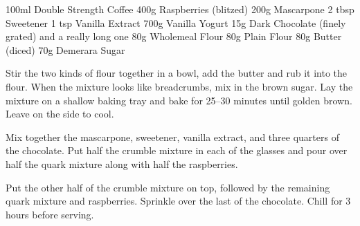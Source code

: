 \vegetarian
\freeze
\begin{ingreds}
     100ml Double Strength Coffee
     400g Raspberries (blitzed)
     200g Mascarpone
     2 tbsp Sweetener
     1 tsp Vanilla Extract
     700g Vanilla Yogurt
     15g Dark Chocolate (finely grated) and a really long one
\columnbreak
{}
     80g Wholemeal Flour
     80g Plain Flour
     80g Butter (diced)
     70g Demerara Sugar
\end{ingreds}

\begin{method}
     Stir the two kinds of flour together in a bowl, add the butter and rub it into the flour. When the mixture looks like breadcrumbs, mix in the brown sugar. Lay the mixture on a shallow baking tray and bake for 25--30 minutes until golden brown. Leave on the side to cool.

     Mix together the mascarpone, sweetener, vanilla extract, and three quarters of the chocolate. Put half the crumble mixture in each of the glasses and pour over half the quark mixture along with half the raspberries.

     Put the other half of the crumble mixture on top, followed by the remaining quark mixture and raspberries. Sprinkle over the last of the chocolate. Chill for 3 hours before serving.
\end {method}

